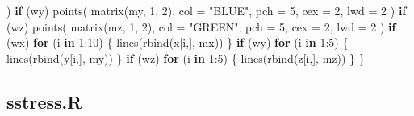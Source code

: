 \documentclass[
  12pt,
  letterpaper,
  DIV=11,
  numbers=noendperiod]{scrreprt}
\newenvironment{Shaded}{\begin{snugshade}}{\end{snugshade}}
\newcommand{\AttributeTok}[1]{\textcolor[rgb]{0.40,0.45,0.13}{#1}}
\newcommand{\ControlFlowTok}[1]{\textcolor[rgb]{0.00,0.23,0.31}{\textbf{#1}}}
\newcommand{\DecValTok}[1]{\textcolor[rgb]{0.68,0.00,0.00}{#1}}
\newcommand{\FunctionTok}[1]{\textcolor[rgb]{0.28,0.35,0.67}{#1}}
\newcommand{\NormalTok}[1]{\textcolor[rgb]{0.00,0.23,0.31}{#1}}
\newcommand{\SpecialCharTok}[1]{\textcolor[rgb]{0.37,0.37,0.37}{#1}}
\newcommand{\StringTok}[1]{\textcolor[rgb]{0.13,0.47,0.30}{#1}}
\theoremstyle{remark}
\begin{document}
\begin{Shaded}
\begin{Highlighting}[]
\NormalTok{    )}
  \ControlFlowTok{if}\NormalTok{ (wy)}
    \FunctionTok{points}\NormalTok{(}
      \FunctionTok{matrix}\NormalTok{(my, }\DecValTok{1}\NormalTok{, }\DecValTok{2}\NormalTok{),}
      \AttributeTok{col =} \StringTok{"BLUE"}\NormalTok{,}
      \AttributeTok{pch =} \DecValTok{5}\NormalTok{,}
      \AttributeTok{cex =} \DecValTok{2}\NormalTok{,}
      \AttributeTok{lwd =} \DecValTok{2}
\NormalTok{    )}
  \ControlFlowTok{if}\NormalTok{ (wz)}
    \FunctionTok{points}\NormalTok{(}
      \FunctionTok{matrix}\NormalTok{(mz, }\DecValTok{1}\NormalTok{, }\DecValTok{2}\NormalTok{),}
      \AttributeTok{col =} \StringTok{"GREEN"}\NormalTok{,}
      \AttributeTok{pch =} \DecValTok{5}\NormalTok{,}
      \AttributeTok{cex =} \DecValTok{2}\NormalTok{,}
      \AttributeTok{lwd =} \DecValTok{2}
\NormalTok{    )}
  \ControlFlowTok{if}\NormalTok{ (wx)}
    \ControlFlowTok{for}\NormalTok{ (i }\ControlFlowTok{in} \DecValTok{1}\SpecialCharTok{:}\DecValTok{10}\NormalTok{) \{}
      \FunctionTok{lines}\NormalTok{(}\FunctionTok{rbind}\NormalTok{(x[i,], mx))}
\NormalTok{    \}}
  \ControlFlowTok{if}\NormalTok{ (wy)}
    \ControlFlowTok{for}\NormalTok{ (i }\ControlFlowTok{in} \DecValTok{1}\SpecialCharTok{:}\DecValTok{5}\NormalTok{) \{}
      \FunctionTok{lines}\NormalTok{(}\FunctionTok{rbind}\NormalTok{(y[i,], my))}
\NormalTok{    \}}
  \ControlFlowTok{if}\NormalTok{ (wz)}
    \ControlFlowTok{for}\NormalTok{ (i }\ControlFlowTok{in} \DecValTok{1}\SpecialCharTok{:}\DecValTok{5}\NormalTok{) \{}
      \FunctionTok{lines}\NormalTok{(}\FunctionTok{rbind}\NormalTok{(z[i,], mz))}
\NormalTok{    \}}
\NormalTok{\}}
\end{Highlighting}
\end{Shaded}

\subsection*{sstress.R}\label{apcodesstress}
\end{document}
